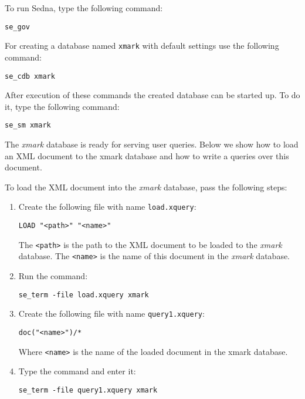 \documentclass[a4paper,12pt]{article}
\begin{document}
To run Sedna, type the following command:

\begin{verbatim}
se_gov
\end{verbatim}

For creating a database named \verb!xmark! with default settings use the
following command:

\begin{verbatim}
se_cdb xmark
\end{verbatim}

After execution of these commands the created database can be started up. To do
it, type the following command:

\begin{verbatim}
se_sm xmark
\end{verbatim}

The \emph{xmark} database is ready for serving user queries. Below we show how
to load an XML document to the xmark database and how to write a queries over
this document.

To load the XML document into the \emph{xmark} database, pass the following
steps:

\begin{enumerate}
\item Create the following file with name \verb!load.xquery!:

\begin{verbatim}
LOAD "<path>" "<name>"
\end{verbatim}

The \verb!<path>! is the path to the XML document to be loaded to the
\emph{xmark} database. The \verb!<name>! is the name of this document in the
\emph{xmark} database.

\item Run the command:

\begin{verbatim}
se_term -file load.xquery xmark
\end{verbatim}

\item Create the following file with name \verb!query1.xquery!:

\begin{verbatim}
doc("<name>")/*
\end{verbatim}

Where \verb!<name>! is the name of the loaded document in the xmark database.

\item Type the command and enter it:

\begin{verbatim}
se_term -file query1.xquery xmark
\end{verbatim}
\end{enumerate}
\end{document}
